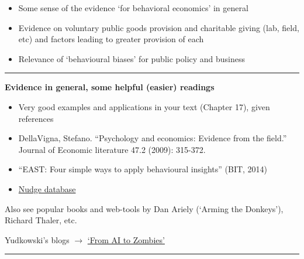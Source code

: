 \documentclass[]{article}
\providecommand{\tightlist}{%
  \setlength{\itemsep}{0pt}\setlength{\parskip}{0pt}}
\begin{document}
\bigskip

\begin{itemize}
\tightlist
\item
  Some sense of the evidence `for behavioral economics' in general
\end{itemize}

\bigskip

\begin{itemize}
\tightlist
\item
  Evidence on voluntary public goods provision and charitable giving (lab, field, etc) and factors leading to greater provision of each
\end{itemize}

\bigskip

\begin{itemize}
\tightlist
\item
  Relevance of `behavioural biases' for public policy and business
\end{itemize}

\begin{center}\rule{0.5\linewidth}{\linethickness}\end{center}

\textbf{Evidence in general, some helpful (easier) readings}

\begin{itemize}
\item
  Very good examples and applications in your text (Chapter 17), given references
\item
  DellaVigna, Stefano. ``Psychology and economics: Evidence from the field.'' Journal of Economic literature 47.2 (2009): 315-372.
\item
  ``EAST: Four simple ways to apply behavioural insights'' (BIT, 2014)
\item
  \href{https://www.stir.ac.uk/media/schools/management/documents/economics/Nudge\%20Database\%201.2.pdf}{Nudge database}
\end{itemize}

\bigskip

Also see popular books and web-tools by Dan Ariely (`Arming the Donkeys'), Richard Thaler, etc.

Yudkowski's blogs \(\rightarrow\) \href{https://wiki.lesswrong.com/wiki/Rationality:_From_AI_to_Zombies'}{`From AI to Zombies'}

\begin{center}\rule{0.5\linewidth}{\linethickness}\end{center}
\end{document}
